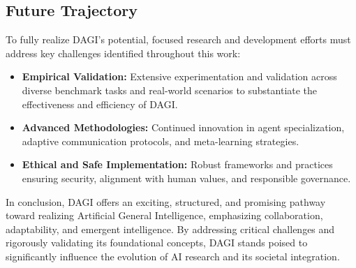 \documentclass[12pt]{amsart}
\begin{document}
\subsection{Future Trajectory}

To fully realize DAGI’s potential, focused research and development efforts must address key challenges identified throughout this work:

\begin{itemize}
    \item \textbf{Empirical Validation:} Extensive experimentation and validation across diverse benchmark tasks and real-world scenarios to substantiate the effectiveness and efficiency of DAGI.
    \item \textbf{Advanced Methodologies:} Continued innovation in agent specialization, adaptive communication protocols, and meta-learning strategies.
    \item \textbf{Ethical and Safe Implementation:} Robust frameworks and practices ensuring security, alignment with human values, and responsible governance.
\end{itemize}

In conclusion, DAGI offers an exciting, structured, and promising pathway toward realizing Artificial General Intelligence, emphasizing collaboration, adaptability, and emergent intelligence. By addressing critical challenges and rigorously validating its foundational concepts, DAGI stands poised to significantly influence the evolution of AI research and its societal integration.
\end{document}
